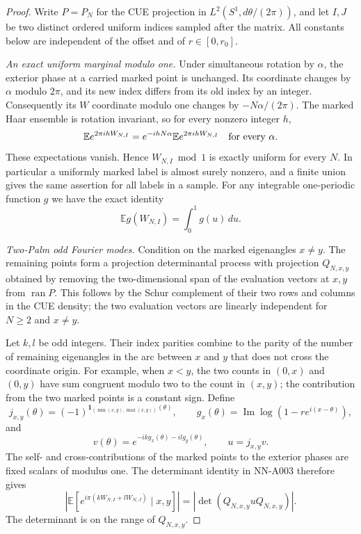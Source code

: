\begin{proof}
Write $P=P_N$ for the CUE projection in
$L^2(S^1,d\theta/(2\pi))$, and let $I,J$ be two distinct ordered
uniform indices sampled after the matrix. All constants below
are independent of the offset and of $r\in[0,r_0]$.

\emph{An exact uniform marginal modulo one.}
Under simultaneous rotation by $\alpha$, the exterior phase at
a carried marked point is unchanged. Its coordinate changes by
$\alpha$ modulo $2\pi$, and its new index differs from its old
index by an integer. Consequently its $W$ coordinate modulo one
changes by $-N\alpha/(2\pi)$. The marked Haar ensemble is
rotation invariant, so for every nonzero integer $h$,
\[
 \mathbb E e^{2\pi ihW_{N,I}}
 =e^{-ihN\alpha}\mathbb E e^{2\pi ihW_{N,I}}
 \quad\hbox{for every }\alpha.
\]
These expectations vanish. Hence $W_{N,I}\bmod1$ is exactly
uniform for every $N$. In particular a uniformly marked label
is almost surely nonzero, and a finite union gives the same
assertion for all labels in a sample. For any integrable
one-periodic function $g$ we have the exact identity
\begin{equation}\label{eq:analytic-cue-exact-modone}
             \mathbb E g(W_{N,I})=\int_0^1g(u)\,du.
\end{equation}

\emph{Two-Palm odd Fourier modes.}
Condition on the marked eigenangles $x\ne y$. The remaining
points form a projection determinantal process with projection
$Q_{N,x,y}$ obtained by removing the two-dimensional span of
the evaluation vectors at $x,y$ from $\operatorname{ran}P$.
This follows by the Schur complement of their two rows and
columns in the CUE density; the two evaluation vectors are
linearly independent for $N\ge2$ and $x\ne y$.

Let $k,l$ be odd integers. Their index parities combine to the
parity of the number of remaining eigenangles in the arc
between $x$ and $y$ that does not cross the coordinate origin.
For example, when $x<y$, the two counts in $(0,x)$ and $(0,y)$
have sum congruent modulo two to the count in $(x,y)$; the
contribution from the two marked points is a constant sign.
Define
\[
 j_{x,y}(\theta)=(-1)^{\mathbf1_{(\min(x,y),\max(x,y))}(\theta)},
 \qquad g_x(\theta)=\operatorname{Im}\log(1-re^{i(x-\theta)}),
\]
and
\[
 v(\theta)=e^{-ikg_x(\theta)-ilg_y(\theta)},\qquad u=j_{x,y}v.
\]
The self- and cross-contributions of the marked points to the
exterior phases are fixed scalars of modulus one. The determinant
identity in NN-A003 therefore gives
\begin{equation}\label{eq:analytic-cue-two-palm-mode}
 \left|\mathbb E\left[e^{i\pi(kW_{N,I}+lW_{N,J})}
                     \mid x,y\right]\right|
   =\left|\det(Q_{N,x,y}uQ_{N,x,y})\right|.
\end{equation}
The determinant is on the range of $Q_{N,x,y}$.


\end{proof}
